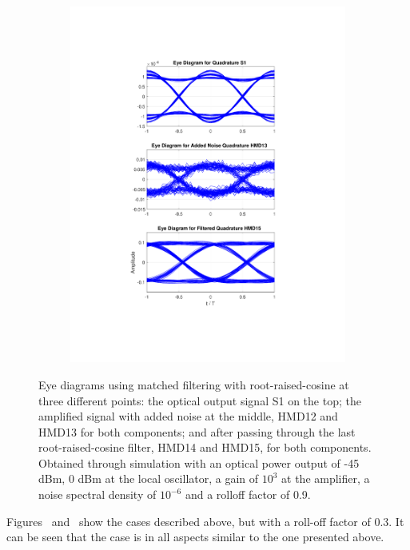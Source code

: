\begin{figure}[H]
\begin{subfigure}{.45\textwidth}
		\includegraphics[clip, trim=5cm 4cm 5cm 4cm, width=\textwidth]{./sdf/m_qam_system/figures/eyes/q_p_45_09.pdf}
	\end{subfigure}
	
	\caption{Eye diagrams using matched filtering with root-raised-cosine
		at three different points: the optical output signal S1 on the top; the
		amplified signal with added noise at the middle, HMD12 and HMD13 for both
		components; and after passing through the last root-raised-cosine filter, HMD14
		and HMD15, for both components. Obtained through simulation with an optical
		power output of -45 dBm, 0 dBm at the local oscillator, a gain of $10^3$ at the
		amplifier, a noise spectral density of $10^{-6}$ and a rolloff factor of
		0.9.\label{fig:eyes_n_rrc_45_09}}
\end{figure}


Figures~\label{fig:eyes_n_rc_45_03} and~\label{fig:eyes_n_rrc_45_03} show the
cases described above, but with a roll-off factor of 0.3. It can be seen that
the case is in all aspects similar to the one presented above.


